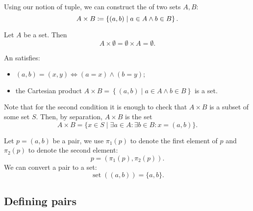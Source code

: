 Using our notion of tuple, we can construct the  of two sets $A,B$:
\[ A\times B \coloneqq \left\{ (a,b) \;|\; a\in A\land b\in B \right\}. \]

\begin{lemma}
Let $A$ be a set. Then
\[ A\times \emptyset = \emptyset\times A = \emptyset. \]
\end{lemma}

\begin{definition}
An  satisfies:
\begin{itemize}
\item $(a,b) = (x,y) \iff (a=x)\land (b=y)$;
\item the Cartesian product $A\times B = \left\{ (a,b) \;|\; a\in A\land b\in B \right\}$ is a set.
\end{itemize}
\end{definition}
Note that for the second condition it is enough to check that $A\times B$ is a subset of some set $S$. Then, by separation, $A\times B$ is the set
\[ A\times B = \{ x\in S\;|\; \exists a\in A:\exists b\in B: x = (a,b) \}. \]


\begin{definition}
Let $p = (a,b)$ be a pair, we use $\pi_1(p)$ to denote the first element of $p$ and $\pi_2(p)$ to denote the second element:
\[ p = (\pi_1(p),\pi_2(p)). \]
We can convert a pair to a set:
\[ \operatorname{set}((a,b)) = \{a,b\}. \]
\end{definition}
\subsection{Defining pairs}
